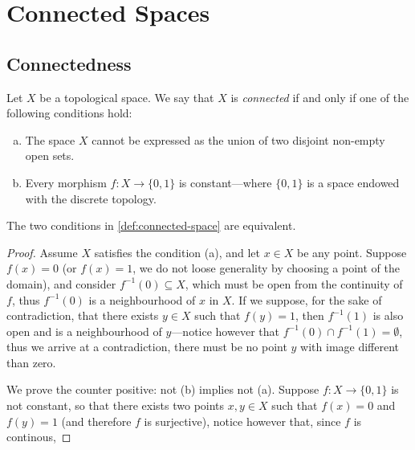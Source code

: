 \section{Connected Spaces}

\subsection{Connectedness}

\begin{definition}
    \label{def:connected-space}
    Let \(X\) be a topological space. We say that \(X\) is \emph{connected} if and
    only if one of the following conditions hold:
    \begin{enumerate}[(a)]\setlength\itemsep{0em}
        \item The space \(X\) cannot be expressed as the union of two disjoint non-empty
              open sets.
        \item Every morphism \(f: X \to \{0, 1\}\) is constant---where \(\{0, 1\}\) is
              a space endowed with the discrete topology.
    \end{enumerate}
\end{definition}

\begin{corollary}
    The two conditions in \cref{def:connected-space} are equivalent.
\end{corollary}

\begin{proof}
    Assume \(X\) satisfies the condition (a), and let \(x \in X\) be any
    point. Suppose \(f(x) = 0\) (or \(f(x) = 1\), we do not loose generality by
    choosing a point of the domain), and consider \(f^{-1}(0) \subseteq X\), which
    must be open from the continuity of \(f\), thus \(f^{-1}(0)\) is a neighbourhood
    of \(x\) in \(X\). If we suppose, for the sake of contradiction, that there
    exists \(y \in X\) such that \(f(y) = 1\), then \(f^{-1}(1)\) is also open and
    is a neighbourhood of \(y\)---notice however that \(f^{-1}(0) \cap f^{-1}(1) =
    \emptyset\), thus we arrive at a contradiction, there must be no point \(y\)
    with image different than zero.

    We prove the counter positive: not (b) implies not (a). Suppose \(f: X
    \to \{0, 1\}\) is not constant, so that there exists two points \(x, y \in X\)
    such that \(f(x) = 0\) and \(f(y) = 1\) (and therefore \(f\) is surjective),
    notice however that, since \(f\) is continous,
\end{proof}

